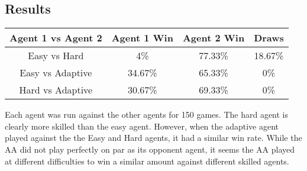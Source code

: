 \documentclass[12pt]{article}
\begin{document}
\subsection*{Results}
\begin{center}
    \begin{tabular}{ | c | c | c | c | }
        \hline
        Agent 1 vs Agent 2 & Agent 1 Win & Agent 2 Win & Draws \\
        \hline
        Easy vs Hard & 4\% & 77.33\% & 18.67\% \\
        \hline
        Easy vs Adaptive & 34.67\% & 65.33\% & 0\% \\
        \hline
        Hard vs Adaptive & 30.67\% & 69.33\% & 0\% \\
        \hline
    \end{tabular}
\end{center}

Each agent was run against the other agents for 150 games. The hard agent is clearly more skilled than the easy agent. However, when the adaptive agent played against the the Easy and Hard agents, it had a similar win rate. While the AA did not play perfectly on par as its opponent agent, it seems the AA played at different difficulties to win a similar amount against different skilled agents.
\end{document}
